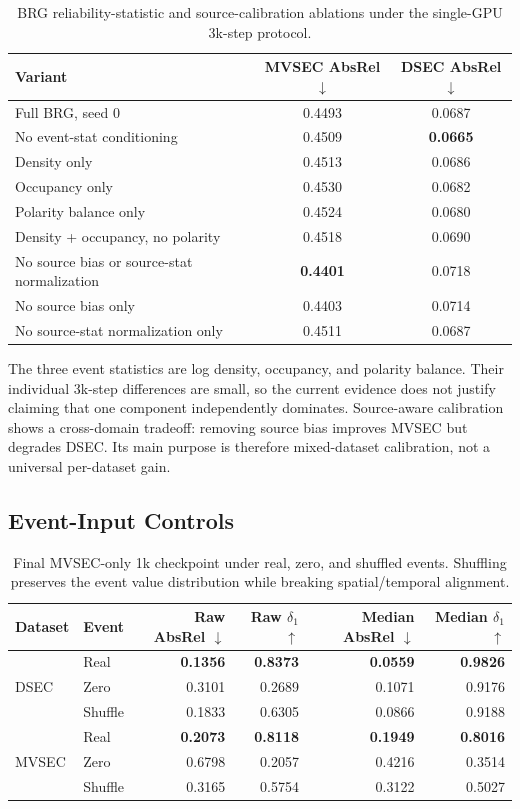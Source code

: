 \documentclass[10pt]{article}
\newcommand{\best}[1]{\textbf{#1}}
\newcommand{\down}{\ensuremath{\downarrow}}
\newcommand{\up}{\ensuremath{\uparrow}}
\begin{document}
\begin{table}[h]
\centering
\caption{BRG reliability-statistic and source-calibration ablations under the
single-GPU 3k-step protocol.}
\label{tab:stats}
\begin{tabular}{lcc}
\toprule
Variant & MVSEC AbsRel \down & DSEC AbsRel \down \\
\midrule
Full BRG, seed 0 & 0.4493 & 0.0687 \\
No event-stat conditioning & 0.4509 & \best{0.0665} \\
Density only & 0.4513 & 0.0686 \\
Occupancy only & 0.4530 & 0.0682 \\
Polarity balance only & 0.4524 & 0.0680 \\
Density + occupancy, no polarity & 0.4518 & 0.0690 \\
No source bias or source-stat normalization & \best{0.4401} & 0.0718 \\
No source bias only & 0.4403 & 0.0714 \\
No source-stat normalization only & 0.4511 & 0.0687 \\
\bottomrule
\end{tabular}
\end{table}

The three event statistics are log density, occupancy, and polarity balance.
Their individual 3k-step differences are small, so the current evidence does
not justify claiming that one component independently dominates.  Source-aware
calibration shows a cross-domain tradeoff: removing source bias improves MVSEC
but degrades DSEC.  Its main purpose is therefore mixed-dataset calibration,
not a universal per-dataset gain.

\subsection{Event-Input Controls}

\begin{table}[h]
\centering
\caption{Final MVSEC-only 1k checkpoint under real, zero, and shuffled events.
Shuffling preserves the event value distribution while breaking
spatial/temporal alignment.}
\label{tab:event-control}
\begin{tabular}{llrrrr}
\toprule
Dataset & Event & Raw AbsRel \down & Raw $\delta_1$ \up & Median AbsRel \down & Median $\delta_1$ \up \\
\midrule
\multirow{3}{*}{DSEC} & Real & \best{0.1356} & \best{0.8373} & \best{0.0559} & \best{0.9826} \\
 & Zero & 0.3101 & 0.2689 & 0.1071 & 0.9176 \\
 & Shuffle & 0.1833 & 0.6305 & 0.0866 & 0.9188 \\
\midrule
\multirow{3}{*}{MVSEC} & Real & \best{0.2073} & \best{0.8118} & \best{0.1949} & \best{0.8016} \\
 & Zero & 0.6798 & 0.2057 & 0.4216 & 0.3514 \\
 & Shuffle & 0.3165 & 0.5754 & 0.3122 & 0.5027 \\
\bottomrule
\end{tabular}
\end{table}
\end{document}
